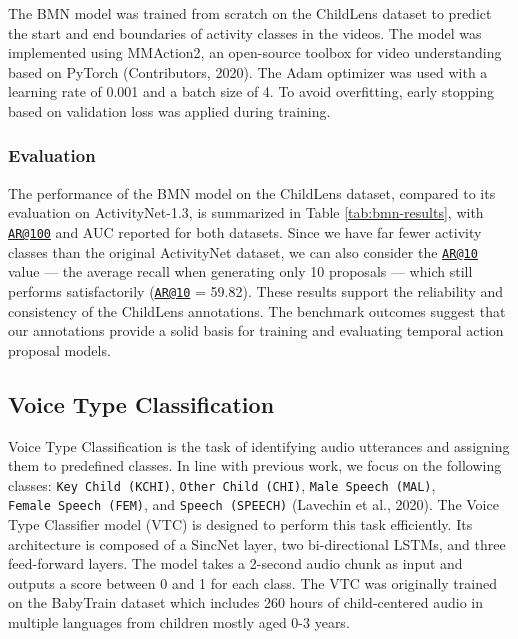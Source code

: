 \documentclass[
  man,floatsintext]{apa6}
\begin{document}
The BMN model was trained from scratch on the ChildLens dataset to predict the start and end boundaries of activity classes in the videos. The model was implemented using MMAction2, an open-source toolbox for video understanding based on PyTorch (Contributors, 2020). The Adam optimizer was used with a learning rate of 0.001 and a batch size of 4. To avoid overfitting, early stopping based on validation loss was applied during training.

\subsubsection{Evaluation}\label{evaluation}

The performance of the BMN model on the ChildLens dataset, compared to its evaluation on ActivityNet-1.3, is summarized in Table \ref{tab:bmn-results}, with \href{mailto:AR@100}{\nolinkurl{AR@100}} and AUC reported for both datasets. Since we have far fewer activity classes than the original ActivityNet dataset, we can also consider the \href{mailto:AR@10}{\nolinkurl{AR@10}} value --- the average recall when generating only 10 proposals --- which still performs satisfactorily (\href{mailto:AR@10}{\nolinkurl{AR@10}} = 59.82). These results support the reliability and consistency of the ChildLens annotations. The benchmark outcomes suggest that our annotations provide a solid basis for training and evaluating temporal action proposal models.

\subsection{Voice Type Classification}\label{voice-type-classification}

Voice Type Classification is the task of identifying audio utterances and assigning them to predefined classes. In line with previous work, we focus on the following classes: \texttt{Key\ Child\ (KCHI)}, \texttt{Other\ Child\ (CHI)}, \texttt{Male\ Speech\ (MAL)}, \texttt{Female\ Speech\ (FEM)}, and \texttt{Speech\ (SPEECH)} (Lavechin et al., 2020). The Voice Type Classifier model (VTC) is designed to perform this task efficiently. Its architecture is composed of a SincNet layer, two bi-directional LSTMs, and three feed-forward layers. The model takes a 2-second audio chunk as input and outputs a score between 0 and 1 for each class. The VTC was originally trained on the BabyTrain dataset which includes 260 hours of child-centered audio in multiple languages from children mostly aged 0-3 years.
\end{document}
